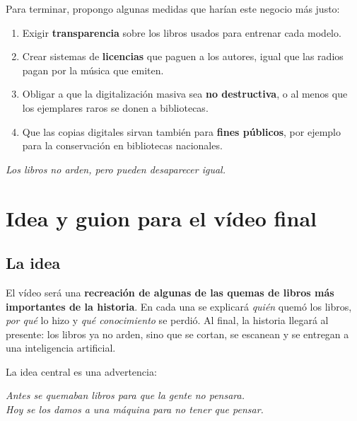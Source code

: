 \documentclass[11pt,a4paper,twoside,openright]{book}
\begin{document}
Para terminar, propongo algunas medidas que harían este negocio más justo:

\begin{enumerate}
  \item Exigir \textbf{transparencia} sobre los libros usados para entrenar cada
        modelo.
  \item Crear sistemas de \textbf{licencias} que paguen a los autores, igual que
        las radios pagan por la música que emiten.
  \item Obligar a que la digitalización masiva sea \textbf{no destructiva}, o al
        menos que los ejemplares raros se donen a bibliotecas.
  \item Que las copias digitales sirvan también para \textbf{fines públicos}, por
        ejemplo para la conservación en bibliotecas nacionales.
\end{enumerate}

\begin{flushright}
  \large\textit{Los libros no arden, pero pueden desaparecer igual.}
\end{flushright}

\chapter{Idea y guion para el vídeo final}

\section{La idea}

El vídeo será una \textbf{recreación de algunas de las quemas de libros más
importantes de la historia}. En cada una se explicará \emph{quién} quemó los
libros, \emph{por qué} lo hizo y \emph{qué conocimiento} se perdió. Al final, la
historia llegará al presente: los libros ya no arden, sino que se cortan, se
escanean y se entregan a una inteligencia artificial.

La idea central es una advertencia:

\begin{center}
  \large\textit{Antes se quemaban libros para que la gente no pensara.\\
  Hoy se los damos a una máquina para no tener que pensar.}
\end{center}
\end{document}
